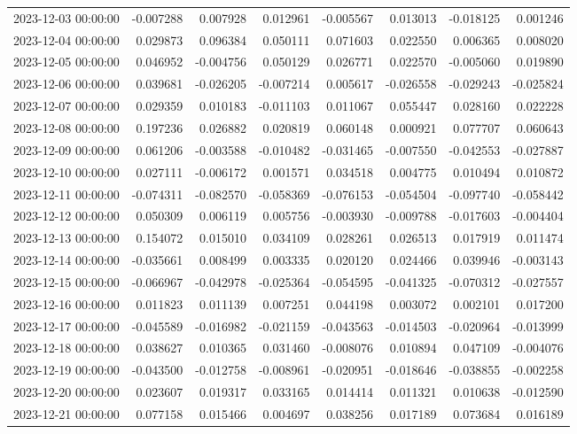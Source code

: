 \begin{tabular}{lrrrrrrr}
2023-12-03 00:00:00 & -0.007288 & 0.007928 & 0.012961 & -0.005567 & 0.013013 & -0.018125 & 0.001246 \\
2023-12-04 00:00:00 & 0.029873 & 0.096384 & 0.050111 & 0.071603 & 0.022550 & 0.006365 & 0.008020 \\
2023-12-05 00:00:00 & 0.046952 & -0.004756 & 0.050129 & 0.026771 & 0.022570 & -0.005060 & 0.019890 \\
2023-12-06 00:00:00 & 0.039681 & -0.026205 & -0.007214 & 0.005617 & -0.026558 & -0.029243 & -0.025824 \\
2023-12-07 00:00:00 & 0.029359 & 0.010183 & -0.011103 & 0.011067 & 0.055447 & 0.028160 & 0.022228 \\
2023-12-08 00:00:00 & 0.197236 & 0.026882 & 0.020819 & 0.060148 & 0.000921 & 0.077707 & 0.060643 \\
2023-12-09 00:00:00 & 0.061206 & -0.003588 & -0.010482 & -0.031465 & -0.007550 & -0.042553 & -0.027887 \\
2023-12-10 00:00:00 & 0.027111 & -0.006172 & 0.001571 & 0.034518 & 0.004775 & 0.010494 & 0.010872 \\
2023-12-11 00:00:00 & -0.074311 & -0.082570 & -0.058369 & -0.076153 & -0.054504 & -0.097740 & -0.058442 \\
2023-12-12 00:00:00 & 0.050309 & 0.006119 & 0.005756 & -0.003930 & -0.009788 & -0.017603 & -0.004404 \\
2023-12-13 00:00:00 & 0.154072 & 0.015010 & 0.034109 & 0.028261 & 0.026513 & 0.017919 & 0.011474 \\
2023-12-14 00:00:00 & -0.035661 & 0.008499 & 0.003335 & 0.020120 & 0.024466 & 0.039946 & -0.003143 \\
2023-12-15 00:00:00 & -0.066967 & -0.042978 & -0.025364 & -0.054595 & -0.041325 & -0.070312 & -0.027557 \\
2023-12-16 00:00:00 & 0.011823 & 0.011139 & 0.007251 & 0.044198 & 0.003072 & 0.002101 & 0.017200 \\
2023-12-17 00:00:00 & -0.045589 & -0.016982 & -0.021159 & -0.043563 & -0.014503 & -0.020964 & -0.013999 \\
2023-12-18 00:00:00 & 0.038627 & 0.010365 & 0.031460 & -0.008076 & 0.010894 & 0.047109 & -0.004076 \\
2023-12-19 00:00:00 & -0.043500 & -0.012758 & -0.008961 & -0.020951 & -0.018646 & -0.038855 & -0.002258 \\
2023-12-20 00:00:00 & 0.023607 & 0.019317 & 0.033165 & 0.014414 & 0.011321 & 0.010638 & -0.012590 \\
2023-12-21 00:00:00 & 0.077158 & 0.015466 & 0.004697 & 0.038256 & 0.017189 & 0.073684 & 0.016189 \\

\end{tabular}
